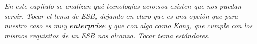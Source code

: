 
\textit{En este capítulo se analizan qué tecnologías \gls{acro:soa} existen que nos puedan servir. Tocar el tema de ESB, dejando en claro que es una opción que para nuestro caso es muy \textbf{enterprise} y que con algo como Kong, que cumple con los mismos requisitos de un ESB nos alcanza. Tocar tema estándares.}
